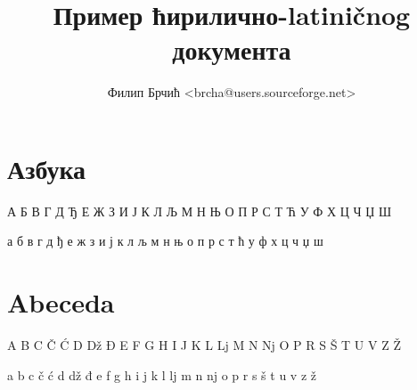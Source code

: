 \documentclass{report}
\title{Пример ћирилично-latiničnog документа}
\author{Филип Брчић <brcha@users.sourceforge.net>}
\begin{document}
\maketitle

\chapter{Азбука}

А Б В Г Д Ђ Е Ж З И Ј К Л Љ М Н Њ О П Р С Т Ћ У Ф Х Ц Ч Џ Ш

а б в г д ђ е ж з и ј к л љ м н њ о п р с т ћ у ф х ц ч џ ш

\chapter{Abeceda}

A B C Č Ć D Dž Đ E F G H I J K L Lj M N Nj O P R S Š T U V Z Ž

a b c č ć d dž đ e f g h i j k l lj m n nj o p r s š t u v z ž
\end{document}
